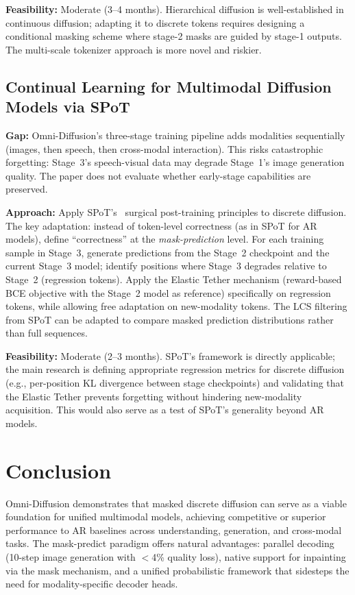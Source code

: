 \documentclass[11pt]{article}
\begin{document}
\textbf{Feasibility:} Moderate (3--4 months). Hierarchical diffusion is well-established in continuous diffusion; adapting it to discrete tokens requires designing a conditional masking scheme where stage-2 masks are guided by stage-1 outputs. The multi-scale tokenizer approach is more novel and riskier.

\subsection{Continual Learning for Multimodal Diffusion Models via SPoT}

\textbf{Gap:} Omni-Diffusion's three-stage training pipeline adds modalities sequentially (images, then speech, then cross-modal interaction). This risks catastrophic forgetting: Stage~3's speech-visual data may degrade Stage~1's image generation quality. The paper does not evaluate whether early-stage capabilities are preserved.

\textbf{Approach:} Apply SPoT's~\citep{lin2026spot} surgical post-training principles to discrete diffusion. The key adaptation: instead of token-level correctness (as in SPoT for AR models), define ``correctness'' at the \emph{mask-prediction} level. For each training sample in Stage~3, generate predictions from the Stage~2 checkpoint and the current Stage~3 model; identify positions where Stage~3 degrades relative to Stage~2 (regression tokens). Apply the Elastic Tether mechanism (reward-based BCE objective with the Stage~2 model as reference) specifically on regression tokens, while allowing free adaptation on new-modality tokens. The LCS filtering from SPoT can be adapted to compare masked prediction distributions rather than full sequences.

\textbf{Feasibility:} Moderate (2--3 months). SPoT's framework is directly applicable; the main research is defining appropriate regression metrics for discrete diffusion (e.g., per-position KL divergence between stage checkpoints) and validating that the Elastic Tether prevents forgetting without hindering new-modality acquisition. This would also serve as a test of SPoT's generality beyond AR models.

\section{Conclusion}

Omni-Diffusion demonstrates that masked discrete diffusion can serve as a viable foundation for unified multimodal models, achieving competitive or superior performance to AR baselines across understanding, generation, and cross-modal tasks. The mask-predict paradigm offers natural advantages: parallel decoding (10-step image generation with $<$4\% quality loss), native support for inpainting via the mask mechanism, and a unified probabilistic framework that sidesteps the need for modality-specific decoder heads.
\end{document}
